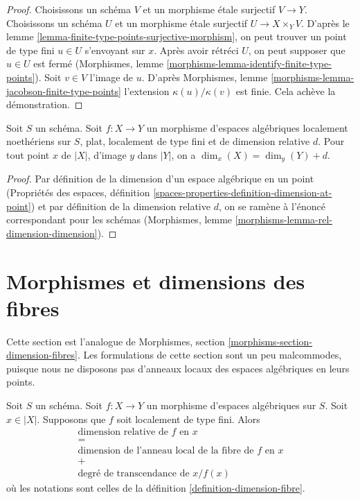 \begin{proof}
Choisissons un schéma $V$ et un morphisme étale surjectif $V \to Y$.
Choisissons un schéma $U$ et un morphisme étale surjectif $U \to X \times_Y V$.
D'après le lemme \ref{lemma-finite-type-points-surjective-morphism},
on peut trouver un point de type fini $u \in U$ s'envoyant sur $x$.
Après avoir rétréci $U$, on peut supposer que $u \in U$ est fermé
(Morphismes, lemme \ref{morphisms-lemma-identify-finite-type-points}).
Soit $v \in V$ l'image de $u$. D'après
Morphismes, lemme \ref{morphisms-lemma-jacobson-finite-type-points}
l'extension $\kappa(u)/\kappa(v)$ est finie.
Cela achève la démonstration.
\end{proof}

\begin{lemma}
\label{lemma-rel-dimension-dimension}
Soit $S$ un schéma. Soit $f : X \to Y$ un morphisme d'espaces algébriques
localement noethériens sur $S$, plat, localement de type fini et de
dimension relative $d$. Pour tout point $x$ de $|X|$, d'image
$y$ dans $|Y|$, on a $\dim_x(X) = \dim_y(Y) + d$.
\end{lemma}

\begin{proof}
Par définition de la dimension d'un espace algébrique
en un point (Propriétés des espaces, définition
\ref{spaces-properties-definition-dimension-at-point})
et par définition de la dimension relative $d$,
on se ramène à l'énoncé correspondant pour les schémas
(Morphismes, lemme \ref{morphisms-lemma-rel-dimension-dimension}).
\end{proof}







\section{Morphismes et dimensions des fibres}
\label{section-dimension-fibres}

\noindent
Cette section est l'analogue de
Morphismes, section \ref{morphisms-section-dimension-fibres}.
Les formulations de cette section sont un peu malcommodes, puisque
nous ne disposons pas d'anneaux locaux des espaces algébriques en leurs points.

\begin{lemma}
\label{lemma-dimension-fibre-at-a-point}
Soit $S$ un schéma.
Soit $f : X \to Y$ un morphisme d'espaces algébriques sur $S$.
Soit $x \in |X|$.
Supposons que $f$ soit localement de type fini.
Alors
$$
\begin{matrix}
\text{dimension relative de }f\text{ en }x \\
= \\
\text{dimension de l'anneau local de la fibre de }f\text{ en }x \\
+ \\
\text{degré de transcendance de }x/f(x)
\end{matrix}
$$
où les notations sont celles de la
définition \ref{definition-dimension-fibre}.
\end{lemma}


